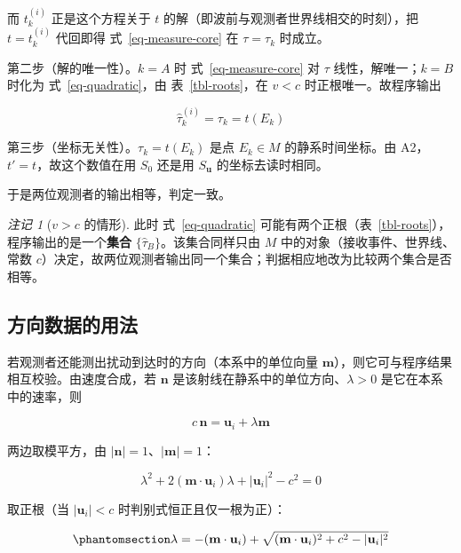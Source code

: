 \documentclass[
  chinese,
  a4paper,
  UTF8,
  12pt,
  oneside,
  openany]{ctexbook}
\theoremstyle{plain}
\theoremstyle{plain}
\theoremstyle{plain}
\theoremstyle{definition}
\theoremstyle{plain}
\theoremstyle{plain}
\theoremstyle{remark}
\newtheorem{refremark}{注记}[chapter]
\begin{document}
而 \(t^{(i)}_{k}\) 正是这个方程关于 \(t\)
的解（即波前与观测者世界线相交的时刻），把 \(t=t^{(i)}_{k}\) 代回即得
式~\ref{eq-measure-core} 在 \(\tau=\tau_{k}\) 时成立。

第二步（解的唯一性）。\(k=A\) 时 式~\ref{eq-measure-core} 对 \(\tau\)
线性，解唯一；\(k=B\) 时化为 式~\ref{eq-quadratic}，由
表~\ref{tbl-roots}，在 \(v<c\) 时正根唯一。故程序输出

\[
\widehat{\tau}^{(i)}_{k}=\tau_{k}=t(E_{k})
\]

第三步（坐标无关性）。\(\tau_{k}=t(E_{k})\) 是点 \(E_{k}\in M\)
的静系时间坐标。由 A2，\(t'=t\)，故这个数值在用 \(S_{0}\) 还是用
\(S_{\mathbf{u}}\) 的坐标去读时相同。

于是两位观测者的输出相等，判定一致。

\begin{refremark}[\(v>c\) 的情形]
此时 式~\ref{eq-quadratic}
可能有两个正根（表~\ref{tbl-roots}），程序输出的是一个\textbf{集合}
\(\{\widehat{\tau}_{B}\}\)。该集合同样只由 \(M\)
中的对象（接收事件、世界线、常数
\(c\)）决定，故两位观测者输出同一个集合；判据相应地改为比较两个集合是否相等。

\label{rem-measurement-supersonic}

\end{refremark}

\subsection{方向数据的用法}\label{ux65b9ux5411ux6570ux636eux7684ux7528ux6cd5}

若观测者还能测出扰动到达时的方向（本系中的单位向量
\(\mathbf{m}\)），则它可与程序结果相互校验。由速度合成，若
\(\mathbf{n}\) 是该射线在静系中的单位方向、\(\lambda>0\)
是它在本系中的速率，则

\[
c\,\mathbf{n}=\mathbf{u}_{i}+\lambda\mathbf{m}
\]

两边取模平方，由 \(|\mathbf{n}|=1\)、\(|\mathbf{m}|=1\)：

\[
\lambda^{2}+2(\mathbf{m}\cdot\mathbf{u}_{i})\lambda+|\mathbf{u}_{i}|^{2}-c^{2}=0
\]

取正根（当 \(|\mathbf{u}_{i}|<c\) 时判别式恒正且仅一根为正）：

\begin{equation}\protect\phantomsection\label{eq-direction-inversion}{
\lambda=-(\mathbf{m}\cdot\mathbf{u}_{i})+\sqrt{(\mathbf{m}\cdot\mathbf{u}_{i})^{2}+c^{2}-|\mathbf{u}_{i}|^{2}}
}\end{equation}
\end{document}
